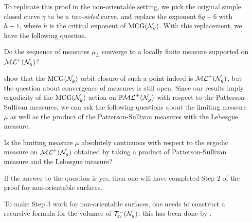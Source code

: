 To replicate this proof in the non-orientable setting, we pick the original simple closed curve $\gamma$ to be a \emph{two-sided} curve, and replace the exponent $6g-6$ with $h + 1$, where $h$ is the critical exponent of $\mathrm{MCG}(\mathcal{N}_g)$.
With this replacement, we have the following question.
\begin{question}
  Do the sequence of measures $\mu_L$ converge to a locally finite measure supported on $\mathcal{ML}^+(\mathcal{N}_g)$?
\end{question}

\textcite{erlandsson2023mapping} show that the $\mathrm{MCG}(\mathcal{N}_g)$ orbit closure of such a point indeed is $\mathcal{ML}^+(\mathcal{N}_g)$, but the question about convergence of measures is still open.
Since our results imply ergodicity of the $\mathrm{MCG}(\mathcal{N}_g)$ action on $\mathbb{P}\mathcal{ML}^+(\mathcal{N}_g)$ with respect to the Patterson-Sullivan measures, we can ask the following questions about the limiting measure $\mu$ as well as the product of the Patterson-Sullivan measures with the Lebesgue measure.

\begin{question}
  Is the limiting measure $\mu$ absolutely continuous with respect to the ergodic measure on $\mathcal{ML}^+(\mathcal{N}_g)$ obtained by taking a product of Patterson-Sullivan measure and the Lebesgue measure?
\end{question}
If the answer to the question is yes, then one will have completed Step 2 of the proof for non-orientable surfaces.

To make Step 3 work for non-orientable surfaces, one needs to construct a recursive formula for the volumes of $\mathcal{T}_{\varepsilon_t}^{-}(\mathcal{N}_g)$: this has been done by \textcite{stanford2023mirzakhani}.



